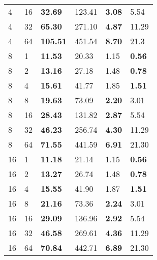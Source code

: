 \begin{table}[!ht]
\begin{tabular}{@{}llllll@{}}
		4 & 16 & \textbf{32.69} & 123.41 & \textbf{3.08} & 5.54 \\ 
		4 & 32 & \textbf{65.30} & 271.10 & \textbf{4.87} & 11.29 \\ 
		4 & 64 & \textbf{105.51} & 451.54 & \textbf{8.70} & 21.3 \\ \midrule
		8 & 1 & \textbf{11.53} & 20.33 & 1.15 & \textbf{0.56} \\ 
		8 & 2 & \textbf{13.16} & 27.18 & 1.48 & \textbf{0.78} \\ 
		8 & 4 & \textbf{15.61} & 41.77 & 1.85 & \textbf{1.51} \\ 
		8 & 8 & \textbf{19.63} & 73.09 & \textbf{2.20} & 3.01 \\ 
		8 & 16 & \textbf{28.43} & 131.82 & \textbf{2.87} & 5.54 \\ 
		8 & 32 & \textbf{46.23} & 256.74 & \textbf{4.30} & 11.29 \\ 
		8 & 64 & \textbf{71.55} & 441.59 & \textbf{6.91} & 21.30 \\ \midrule
		16 & 1 & \textbf{11.18} & 21.14 & 1.15 & \textbf{0.56} \\ 
		16 & 2 & \textbf{13.27} & 26.74 & 1.48 & \textbf{0.78} \\ 
		16 & 4 & \textbf{15.55} & 41.90 & 1.87 & \textbf{1.51} \\ 
		16 & 8 & \textbf{21.16} & 73.36 & \textbf{2.24} & 3.01 \\ 
		16 & 16 & \textbf{29.09} & 136.96 & \textbf{2.92} & 5.54 \\ 
		16 & 32 & \textbf{46.58} & 269.61 & \textbf{4.36} & 11.29 \\ 
		16 & 64 & \textbf{70.84} & 442.71 & \textbf{6.89} & 21.30 \\ \bottomrule
	\end{tabular}
\end{table}